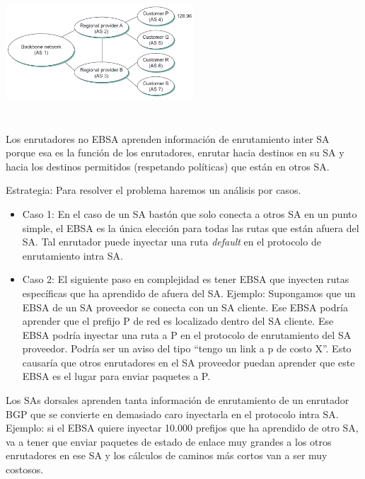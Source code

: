 \documentclass[10pt,a4paper]{report}
\begin{document}
	\begin{center}
		\includegraphics[width=7cm, height=5cm]{./imagenes/fig2.png}
	\end{center}

	\par Los enrutadores no EBSA aprenden información de enrutamiento inter SA porque esa es la función de los enrutadores, enrutar hacia destinos en su SA y hacia los destinos permitidos (respetando políticas) que están en otros SA.

	\par Estrategia: Para resolver el problema haremos un análisis por casos.

	\begin{itemize}
		\item Caso 1: En el caso de un SA bastón que solo conecta a otros SA en un punto simple, el EBSA es la única elección para todas las rutas que están afuera del SA. Tal enrutador puede inyectar una ruta \textit{default} en el protocolo de enrutamiento intra SA.
		\item Caso 2: El siguiente paso en complejidad es tener EBSA que inyecten rutas específicas que ha aprendido de afuera del SA. Ejemplo: Supongamos que un EBSA de un SA proveedor se conecta con un SA cliente. Ese EBSA podría aprender que el prefijo P de red es localizado dentro del SA cliente. Ese EBSA podría inyectar una ruta a P en el protocolo de enrutamiento del SA proveedor. Podría ser un aviso del tipo “tengo un link a p de costo X”. Esto causaría que otros enrutadores en el SA proveedor puedan aprender que este EBSA es el lugar para enviar paquetes a P.
	\end{itemize}

		\par Los SAs dorsales aprenden tanta información de enrutamiento de un enrutador BGP que se convierte en demasiado caro inyectarla en el protocolo intra SA. Ejemplo: si el EBSA quiere inyectar 10.000 prefijos que ha aprendido de otro SA, va a tener que enviar paquetes de estado de enlace muy grandes a los otros enrutadores en ese SA y los cálculos de caminos más cortos van a ser muy costosos.
\end{document}

